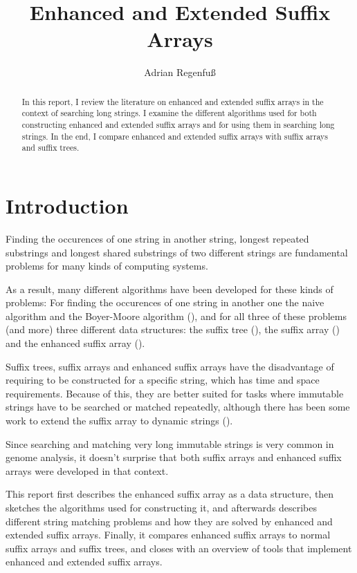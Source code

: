 \documentclass[a4paper,10pt]{article}
\title{Enhanced and Extended Suffix Arrays}
\author{Adrian Regenfuß}
\begin{document}
\maketitle

\begin{abstract}
In this report, I review the literature on enhanced and extended suffix arrays
in the context of searching long strings. I examine the different algorithms
used for both constructing enhanced and extended suffix arrays and for using
them in searching long strings.
In the end, I compare enhanced and extended suffix arrays with suffix arrays
and suffix trees.
\end{abstract}

\section*{Introduction}

Finding the occurences of one string in another string, longest repeated
substrings and longest shared substrings of two different strings are
fundamental problems for many kinds of computing systems.

As a result, many different algorithms have been developed for these kinds
of problems: For finding the occurences of one string in another one the
naive algorithm and the Boyer-Moore algorithm (\citealt{boyer1977fast}),
and for all three of these problems (and more) three different data
structures: the suffix tree (\citealt{weiner1973linear}), the suffix
array (\citealt{manber1993suffix}) and the enhanced suffix array
(\citealt{abouelhoda2002enhanced}).

Suffix trees, suffix arrays and enhanced suffix arrays have the
disadvantage of requiring to be constructed for a specific string,
which has time and space requirements. Because of this, they are better
suited for tasks where immutable strings have to be searched or matched
repeatedly, although there has been some work to extend the suffix array
to dynamic strings (\citealt{salson2010dynamic}).

Since searching and matching very long immutable strings is very common
in genome analysis, it doesn't surprise that both suffix arrays and
enhanced suffix arrays were developed in that context.

This report first describes the enhanced suffix array as a data structure,
then sketches the algorithms used for constructing it, and afterwards
describes different string matching problems and how they are solved
by enhanced and extended suffix arrays. Finally, it compares enhanced
suffix arrays to normal suffix arrays and suffix trees, and closes with
an overview of tools that implement enhanced and extended suffix arrays.
\end{document}
